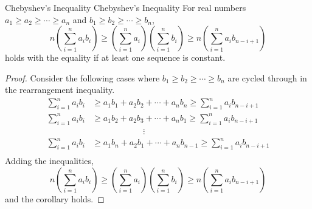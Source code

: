 \documentclass[../main.tex]{subfiles}
\begin{document}
\begin{corollary}
{Chebyshev's Inequality}
{Chebyshev's Inequality}
For real numbers $a_1 \geq a_2 \geq \cdots \geq a_n$ and $b_1 \geq b_2
\geq \cdots \geq b_n$,
\[
n \left( \sum_{i=1}^n a_i b_i \right)
\geq \left( \sum_{i=1}^n a_i \right)
\left( \sum_{i=1}^n b_i \right)
\geq n \left( \sum_{i=1}^n a_i b_{n-i+1} \right)
\]
holds with the equality if at least one sequence is constant.
\end{corollary}
\begin{proof}
Consider the following cases where $b_1 \geq b_2 \geq \cdots \geq b_n$
are cycled through in the rearrangement inequality.
\begin{align*}
    \sum_{i=1}^n a_i b_i
    &\geq a_1 b_1 + a_2 b_2 + \cdots + a_n b_n
    \geq \sum_{i=1}^n a_i b_{n-i+1} \\
    \sum_{i=1}^n a_i b_i
    &\geq a_1 b_2 + a_2 b_3 + \cdots + a_n b_1
    \geq \sum_{i=1}^n a_i b_{n-i+1} \\
    &\qquad\qquad\qquad \vdots \\
    \sum_{i=1}^n a_i b_i
    &\geq a_1 b_n + a_2 b_1 + \cdots + a_n b_{n-1}
    \geq \sum_{i=1}^n a_i b_{n-i+1} \\
\end{align*}
Adding the inequalities,
\[
n \left( \sum_{i=1}^n a_i b_i \right)
\geq \left( \sum_{i=1}^n a_i \right)
\left( \sum_{i=1}^n b_i \right)
\geq n \left( \sum_{i=1}^n a_i b_{n-i+1} \right)
\]
and the corollary holds.
\end{proof}
\end{document}
